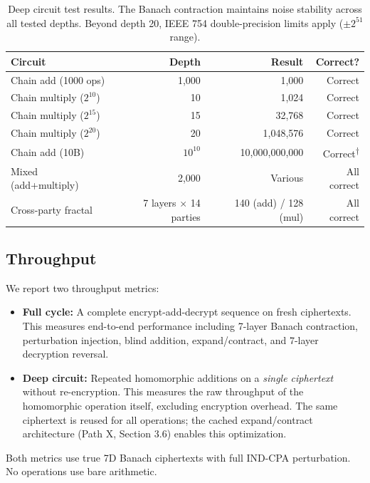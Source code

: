 \documentclass[11pt,a4paper]{article}
\begin{document}
\begin{table}[h]
\centering
\begin{tabular}{@{}lrrr@{}}
\toprule
\textbf{Circuit} & \textbf{Depth} & \textbf{Result} & \textbf{Correct?} \\
\midrule
Chain add (1000 ops) & 1,000 & 1,000 & Correct \\
Chain multiply ($2^{10}$) & 10 & 1,024 & Correct \\
Chain multiply ($2^{15}$) & 15 & 32,768 & Correct \\
Chain multiply ($2^{20}$) & 20 & 1,048,576 & Correct \\
Chain add (10B) & $10^{10}$ & 10,000,000,000 & Correct\textsuperscript{†} \\
Mixed (add+multiply) & 2,000 & Various & All correct \\
Cross-party fractal & 7 layers $\times$ 14 parties & 140 (add) / 128 (mul) & All correct \\
\bottomrule
\end{tabular}
\caption{Deep circuit test results. The Banach contraction maintains noise stability across all tested depths. Beyond depth 20, IEEE 754 double-precision limits apply ($\pm 2^{51}$ range).}
\label{tab:depth}
\end{table}

\subsection{Throughput}

We report two throughput metrics:
\begin{itemize}
    \item \textbf{Full cycle:} A complete encrypt-add-decrypt sequence on fresh ciphertexts. This measures end-to-end performance including 7-layer Banach contraction, perturbation injection, blind addition, expand/contract, and 7-layer decryption reversal.
    \item \textbf{Deep circuit:} Repeated homomorphic additions on a \textit{single ciphertext} without re-encryption. This measures the raw throughput of the homomorphic operation itself, excluding encryption overhead. The same ciphertext is reused for all operations; the cached expand/contract architecture (Path X, Section 3.6) enables this optimization.
\end{itemize}
Both metrics use true 7D Banach ciphertexts with full IND-CPA perturbation. No operations use bare arithmetic.
\end{document}
